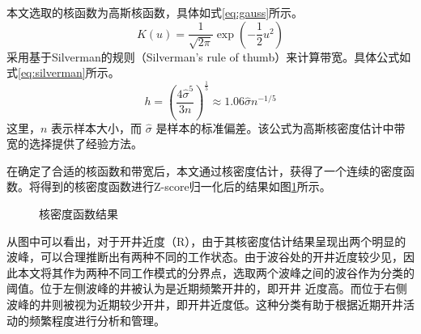 本文选取的核函数为高斯核函数，具体如式\eqref{eq:gauss}所示。
\begin{equation}
    K(u) = \frac{1}{\sqrt{2\pi}} \exp\left(-\frac{1}{2} u^2\right)
    \label{eq:gauss}
\end{equation}
采用基于Silverman的规则（Silverman's rule of thumb）来计算带宽。具体公式如式\eqref{eq:silverman}所示。
\begin{equation}
    h = \left(\frac{4\hat{\sigma}^5}{3n}\right)^{\frac{1}{5}} \approx 1.06 \hat{\sigma} n^{-1/5}
    \label{eq:silverman}
\end{equation}
这里，\( n \) 表示样本大小，而 \( \hat{\sigma} \) 是样本的标准偏差。该公式为高斯核密度估计中带宽的选择提供了经验方法。

在确定了合适的核函数和带宽后，本文通过核密度估计，获得了一个连续的密度函数。将得到的核密度函数进行Z-score归一化后的结果如图\ref{fig:KDE}所示。
\begin{figure}[H]
    \centering
    \hfil
    \hfil
    \caption{核密度函数结果}
    \label{fig:KDE}
\end{figure}
\par
从图中可以看出，对于开井近度（R），由于其核密度估计结果呈现出两个明显的波峰，可以合理推断出有两种不同的工作状态。由于波谷处的开井近度较少见，因此本文将其作为两种不同工作模式的分界点，选取两个波峰之间的波谷作为分类的阈值。位于左侧波峰的井被认为是近期频繁开井的，即开井
近度高。而位于右侧波峰的井则被视为近期较少开井，即开井近度低。这种分类有助于根据近期开井活动的频繁程度进行分析和管理。


